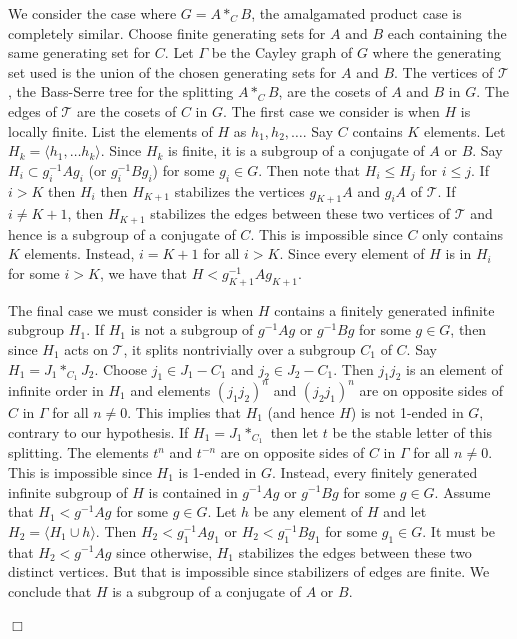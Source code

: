 \documentclass[12pt]{article}
\newenvironment{proof}{\addvspace{12pt}\noindent{\bf Proof:}}{
$\Box$\par\addvspace{12pt}}
\begin{document}
\begin{proof}
We consider the case where $G=A\ast_CB$, the amalgamated product case is completely similar. Choose finite generating sets for $A$ and $B$ each containing  the same generating set for $C$.
Let $\Gamma$ be the Cayley graph of $G$ where the generating set used is the union of the chosen generating sets for $A$ and $B$. The vertices of $\mathcal T$, the Bass-Serre tree for the splitting $A\ast_CB$, are the cosets of $A$ and $B$ in $G$. The edges of $\mathcal T$  are the cosets of $C$ in $G$. 
The first case we consider is when $H$ is locally finite. List the elements of $H$ as $h_1,h_2,\ldots$. Say $C$ contains $K$ elements. Let $H_k=\langle h_1,\ldots h_k\rangle$. Since $H_k$ is finite, it is a subgroup of a conjugate of $A$ or $B$. Say $H_i\subset g_i^{-1} Ag_i$ (or $g_i^{-1} Bg_i$) for some $g_i\in G$. Then note that $H_i\leq H_j$ for $i\leq j$.
If $i>K$ then $H_i$ then $H_{K+1}$ stabilizes the vertices $g_{K+1}A $ and $g_iA$ of $\mathcal T$. If $i\ne K+1$, then $H_{K+1}$ stabilizes the edges between these two vertices of $\mathcal T$ and hence is a subgroup of a conjugate of $C$. This is impossible since $C$ only contains $K$ elements. Instead, $i=K+1$ for all $i>K$. Since every element of $H$ is in $H_i$ for some $i>K$, we have that $H<g_{K+1}^{-1}Ag_{K+1}$. 

The final case we must consider is when $H$ contains a finitely generated infinite subgroup $H_1$. If $H_1$ is not a subgroup of $g^{-1} Ag$ or $g^{-1}Bg$ for some $g\in G$, then since $H_1$ acts on $\mathcal T$, it splits nontrivially over a subgroup $C_1$ of $C$. Say $H_1=J_1\ast _{C_1} J_2$. Choose $j_1\in J_1-C_1$ and $j_2\in J_2-C_1$. Then $j_1j_2$ is an element of infinite order in $H_1$ and elements $(j_1j_2)^n$ and $(j_2j_1)^n$ are on opposite sides of $C$ in $\Gamma$ for all $n\ne 0$. This implies that $H_1$ (and hence $H$) is not 1-ended in $G$, contrary to our hypothesis. If $H_1=J_1\ast_{C_1}$ then let $t$ be the stable letter of this splitting. The elements $t^n$ and $t^{-n}$ are on opposite sides of $C$ in $\Gamma$ for all $n\ne 0$. This is impossible since $H_1$ is 1-ended in $G$. 
Instead, every finitely generated infinite subgroup of $H$ is contained in $g^{-1}Ag$ or $g^{-1} Bg$ for some $g\in G$. 
Assume that $H_1<g^{-1}Ag$ for some $g\in G$. Let $h$ be any element of $H$ and let $H_2=\langle H_1\cup h\rangle$. Then $H_2<g_1^{-1}Ag_1$ or $H_2<g_1^{-1}Bg_1$ for some $g_1\in G$. It must be that $H_2<g^{-1}Ag$ since otherwise,  $H_1$ stabilizes the edges between these two distinct vertices. But that is impossible since stabilizers of edges are finite. We conclude that $H$ is a subgroup of a conjugate of $A$ or $B$.
\end{proof}
\end{document}
